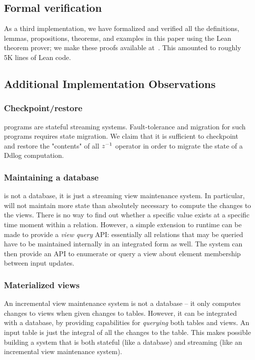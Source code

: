\subsection{Formal verification}

As a third implementation, we have formalized and verified all the
definitions, lemmas, propositions, theorems, and examples in this
paper using the Lean theorem prover; we make these proofs available
at~.  This amounted to roughly 5K lines of Lean code.

\subsection{Additional Implementation Observations}\label{sec:implementation-additional}

\subsubsection{Checkpoint/restore}

\dbsp programs are stateful streaming systems.  Fault-tolerance and
migration for such programs requires state migration.  We claim that it is
sufficient to checkpoint and restore the "contents" of all $z^{-1}$ operator
in order to migrate the state of a Ddlog computation.

\subsubsection{Maintaining a database}

\dbsp is not a database, it is just a streaming view maintenance
system.  In particular, \dbsp will not maintain more state than
absolutely necessary to compute the changes to the views.  There is no
way to find out whether a specific value exists at a specific time
moment within a \dbsp relation.  However, a simple extension to \dbsp
runtime can be made to provide a \emph{view query} API: essentially
all relations that may be queried have to be maintained internally in
an integrated form as well.  The system can then provide an API to
enumerate or query a view about element membership between input
updates.

\subsubsection{Materialized views}

An incremental view maintenance system is not a database -- it only
computes changes to views when given changes to tables.  However, it
can be integrated with a database, by providing capabilities for
\emph{querying} both tables and views.  An input table is just the
integral of all the changes to the table.  This makes possible
building a system that is both stateful (like a database) and
streaming (like an incremental view maintenance system).


